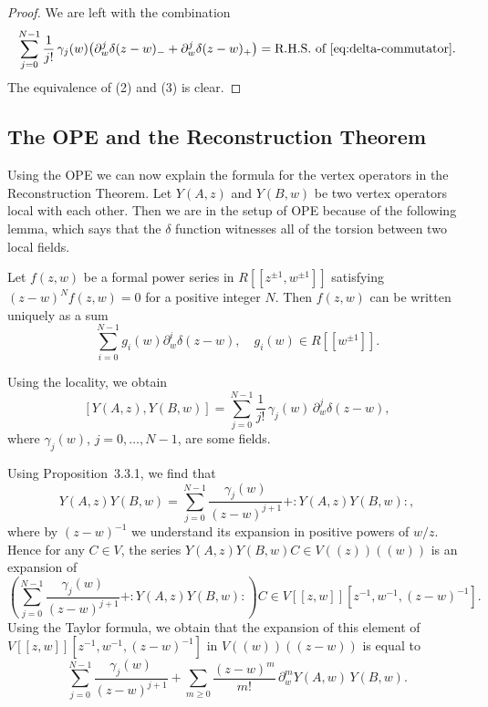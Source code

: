 \documentclass[12pt]{article}
\begin{document}
\begin{proof}
    We are left with the combination
    \[
        \sum_{j=0}^{N-1} \frac{1}{j!}\,\gamma_j(w)
        \big(\partial_w^j \delta(z-w)_- + \partial_w^j \delta(z-w)_+\big)
        = \text{R.H.S. of~\eqref{eq:delta-commutator}}.
    \]
    The equivalence of (2) and (3) is clear.
\end{proof}

\subsection{The OPE and the Reconstruction Theorem}
Using the OPE we can now explain the formula for the vertex operators in the Reconstruction Theorem. Let $Y(A,z)$ and $Y(B,w)$ be two vertex operators local with each other.  Then we are in the setup of OPE because of the following lemma, which says that the $\delta$ function witnesses all of the torsion between two local fields.

\begin{lemma}
    Let $f(z,w)$ be a formal power series in $R[[z^{\pm1},w^{\pm1}]]$
    satisfying $(z-w)^N f(z,w) = 0$ for a positive integer $N$. Then $f(z,w)$ can be written uniquely as a sum
    \[
        \sum_{i=0}^{N-1} g_i(w) \partial_w^i \delta(z-w), \quad g_i(w) \in R[[w^{\pm1}]].
    \]
\end{lemma}


Using the locality, we obtain
\begin{equation}\label{eq:commutator}
    [Y(A,z),Y(B,w)] = \sum_{j=0}^{N-1} \frac{1}{j!}\,\gamma_j(w)\,\partial_w^j\delta(z-w),
\end{equation}
where $\gamma_j(w)$, $j=0,\dots,N-1$, are some fields.

Using Proposition~3.3.1, we find that
\begin{equation}\label{eq:OPE}
    Y(A,z)Y(B,w)
    = \sum_{j=0}^{N-1} \frac{\gamma_j(w)}{(z-w)^{j+1}}
    + :Y(A,z)Y(B,w):,
\end{equation}
where by $(z-w)^{-1}$ we understand its expansion in positive powers of $w/z$.
Hence for any $C\in V$, the series $Y(A,z)Y(B,w)C\in V((z))((w))$ is an expansion of
\[
    \left( \sum_{j=0}^{N-1}\frac{\gamma_j(w)}{(z-w)^{j+1}} + :Y(A,z)Y(B,w): \right) C
    \in V[[z,w]][z^{-1},w^{-1},(z-w)^{-1}].
\]
Using the Taylor formula, we obtain that the expansion of this element of
$V[[z,w]][z^{-1},w^{-1},(z-w)^{-1}]$ in $V((w))((z-w))$ is equal to
\begin{equation}\label{eq:taylor}
    \sum_{j=0}^{N-1}\frac{\gamma_j(w)}{(z-w)^{j+1}}
    + \sum_{m\ge0}\frac{(z-w)^m}{m!}\,\partial_w^m Y(A,w)\,Y(B,w).
\end{equation}
\end{document}
